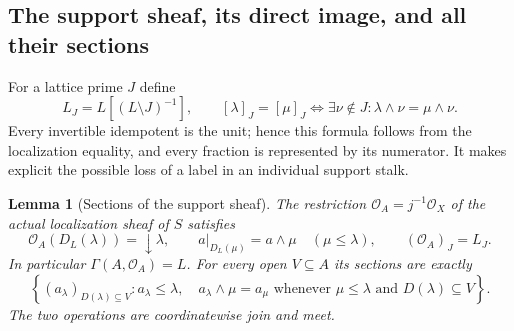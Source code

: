 \documentclass[11pt,a4paper]{article}
\newtheorem{lemma}[theorem]{Lemma}
\theoremstyle{definition}\newtheorem{definition}[theorem]{Definition}
\begin{document}
\subsection{The support sheaf, its direct image, and all their sections}
For a lattice prime $J$ define
\begin{equation}\tag{FSC5}
 L_J=L[(L\setminus J)^{-1}],\qquad
 [\lambda]_J=[\mu]_J\iff
 \exists\nu\notin J:\lambda\wedge\nu=\mu\wedge\nu.
\end{equation}
Every invertible idempotent is the unit; hence this formula follows
from the localization equality, and every fraction is represented by
its numerator. It makes explicit the possible loss of a label in an
individual support stalk.

\begin{lemma}[Sections of the support sheaf]
The restriction $\mathcal O_A=j^{-1}\mathcal O_X$ of the actual
localization sheaf of $S$ satisfies
\begin{equation}\tag{FSC6}
 \mathcal O_A(D_L(\lambda))=\downarrow\lambda,\qquad
 a|_{D_L(\mu)}=a\wedge\mu\quad(\mu\le\lambda),\qquad
 (\mathcal O_A)_J=L_J.
\end{equation}
In particular $\Gamma(A,\mathcal O_A)=L$. For every open $V\subseteq A$
its sections are exactly
\begin{equation}\tag{FSC7}
 \left\{(a_\lambda)_{D(\lambda)\subseteq V}:
 a_\lambda\le\lambda,\quad
 a_\lambda\wedge\mu=a_\mu\text{ whenever }\mu\le\lambda
                         \text{ and }D(\lambda)\subseteq V\right\}.
\end{equation}
The two operations are coordinatewise join and meet.
\end{lemma}
\end{document}

